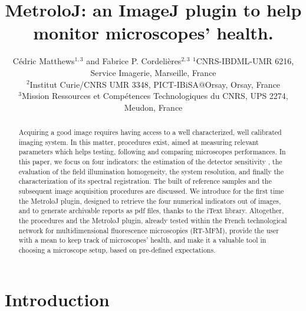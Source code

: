 \documentclass[]{spie}
\title{MetroloJ: an ImageJ plugin to help monitor microscopes' health.}
\author{Cédric Matthews$^{1,3}$ and Fabrice P. Cordelières$^{2,3}$
\skiplinehalf
$^{1}$CNRS-IBDML-UMR 6216, Service Imagerie, Marseille, France\\
$^{2}$Institut Curie/CNRS UMR 3348, PICT-IBiSA@Orsay, Orsay, France\\
$^{3}$Mission Ressources et Compétences Technologiques du CNRS, UPS 2274, Meudon, France}
\begin{document}
\maketitle
\begin{abstract}

Acquiring a good image requires having access to a well characterized, well calibrated imaging system. In this matter, procedures exist, aimed at measuring relevant parameters which helps testing, following and comparing microscopes performances. In this paper, we focus on four indicators: the estimation of the detector sensitivity , the evaluation of the field illumination homogeneity, the system resolution, and finally the characterization of its spectral registration. The built of reference samples and the subsequent image acquisition procedures are discussed. We introduce for the first time the MetroloJ plugin, designed to retrieve the four numerical indicators out of images, and to generate archivable reports as pdf files, thanks to the iText library. Altogether, the procedures and the MetroloJ plugin, already tested within the French technological network for multidimensional fluorescence microscopies (RT-MFM), provide the user with a mean to keep track of microscopes' health, and make it a valuable tool in choosing a microscope setup, based on pre-defined expectations.

\end{abstract}

\section{Introduction}
\label{sec:intro}
\end{document}
